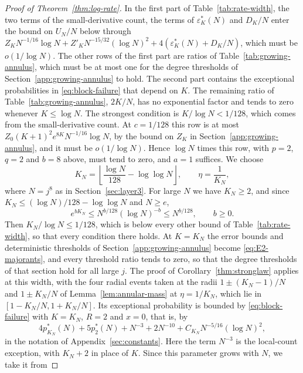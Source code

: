 \begin{proof}[Proof of Theorem~\ref{thm:log-rate}]
\begin{table}[ht]
\caption{The bounds of the proof in Section~\ref{sec:log-rate} that
grow exponentially with the width $K$, and the upper bound on
$K/\log N$ that each requires: $\beta/b$ in the first part and
$(\beta-1/8)/b$ in the second.}
\label{tab:rate-width}
\end{table}
In the first part of Table~\ref{tab:rate-width}, the two terms of the
small-derivative count, the terms of $\varepsilon_K^*(N)$ and $D_K/N$
enter the bound on $U_N/N$ below through
$Z_KN^{-1/16}\log N+Z'_KN^{-15/32}(\log N)^2+4(\varepsilon_K^*(N)+D_K/N)$,
which must be $o(1/\log N)$. The other rows of the first part are ratios
of Table~\ref{tab:growing-annulus}, which must be at most one for the
degree thresholds of Section~\ref{app:growing-annulus} to hold. The
second part contains the exceptional probabilities in
\eqref{eq:block-failure} that depend on $K$. The remaining ratio of
Table~\ref{tab:growing-annulus}, $2K/N$, has no exponential factor and
tends to zero whenever $K\le\log N$.
The strongest condition is $K/\log N<1/128$, which comes from the
small-derivative count. At $c=1/128$ this row is at most
$Z_0(K+1)^2e^{8K}N^{-1/16}\log N$, by the bound on $Z_K$ in
Section~\ref{app:growing-annulus}, and it must be $o(1/\log N)$. Hence
$\log N$ times this row, with $p=2$, $q=2$ and $b=8$ above, must tend to
zero, and $a=1$ suffices. We choose
\[
 K_N=\left\lfloor\frac{\log N}{128}-\log\log N\right\rfloor,
 \qquad\eta=\frac1{K_N},
\]
where $N=j^8$ as in Section~\ref{sec:layer3}. For large $N$ we have
$K_N\ge2$, and since $K_N\le(\log N)/128-\log\log N$ and $N\ge e$,
\[
 e^{bK_N}\le N^{b/128}(\log N)^{-b}\le N^{b/128},\qquad b\ge0.
\]
Then $K_N/\log N\le1/128$, which is below every other bound of
Table~\ref{tab:rate-width}, so that every condition there holds.
At $K=K_N$ the error bounds and deterministic thresholds of
Section~\ref{app:growing-annulus} become \eqref{eq:E2-majorants}, and
every threshold ratio tends to zero, so that the degree thresholds of
that section hold for all large $j$.
The proof of Corollary~\ref{thm:stronglaw} applies at this width, with
the four radial events taken at the radii $1\pm(K_N-1)/N$ and
$1\pm K_N/N$ of Lemma~\ref{lem:annular-mass} at $\eta=1/K_N$, which lie
in $[1-K_N/N,1+K_N/N]$. Its exceptional probability is bounded by
\eqref{eq:block-failure} with $K=K_N$, $R=2$ and $x=0$, that is, by
\[
 4p_{K_N}^*(N)+5p_2^*(N)+N^{-3}+2N^{-10}+C_{K_N}N^{-5/16}(\log N)^2,
\]
in the notation of Appendix~\ref{sec:constants}.
Here the term $N^{-3}$ is the local-count exception, with $K_N+2$ in place
of $K$. Since this parameter grows with $N$, we take it from

\end{proof}
